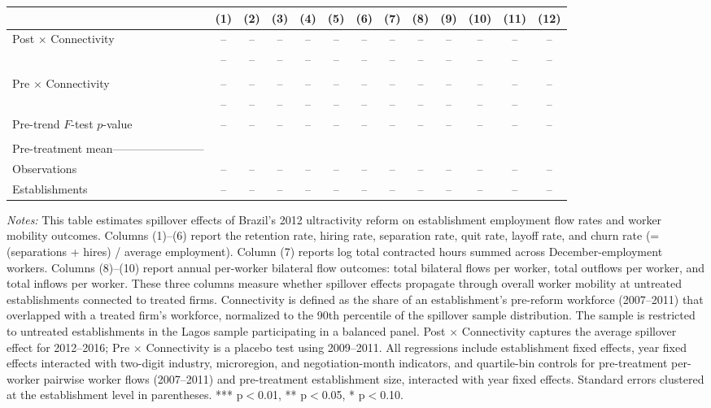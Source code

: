 \documentclass[12pt,letterpaper]{article}
\begin{document}
\begin{table}[]
\begin{threeparttable}
\begin{tabular}{lcccccccccccc}
 & (1) & (2) & (3) & (4) & (5) & (6) & (7) & (8) & (9) & (10) & (11) & (12) \\
\midrule
Post $\times$ Connectivity & -- & -- & -- & -- & -- & -- & -- & -- & -- & -- & -- & -- \\
  & -- & -- & -- & -- & -- & -- & -- & -- & -- & -- & -- & -- \\
  &  &  &  &  &  &  &  &  &  &  &  & \\
Pre $\times$ Connectivity & -- & -- & -- & -- & -- & -- & -- & -- & -- & -- & -- & -- \\
  & -- & -- & -- & -- & -- & -- & -- & -- & -- & -- & -- & -- \\
Pre-trend $F$-test $p$-value & -- & -- & -- & -- & -- & -- & -- & -- & -- & -- & -- & -- \\
  &  &  &  &  &  &  &  &  &  &  &  & \\
Pre-treatment mean------------------------ \\
Observations & -- & -- & -- & -- & -- & -- & -- & -- & -- & -- & -- & -- \\
Establishments & -- & -- & -- & -- & -- & -- & -- & -- & -- & -- & -- & -- \\
\bottomrule
\end{tabular}
\scriptsize
\begin{tablenotes}
\item \textit{Notes:} This table estimates spillover effects of Brazil's 2012 ultractivity reform on establishment employment flow rates and worker mobility outcomes. Columns (1)--(6) report the retention rate, hiring rate, separation rate, quit rate, layoff rate, and churn rate (= (separations + hires) / average employment). Column (7) reports log total contracted hours summed across December-employment workers. Columns (8)--(10) report annual per-worker bilateral flow outcomes: total bilateral flows per worker, total outflows per worker, and total inflows per worker. These three columns measure whether spillover effects propagate through overall worker mobility at untreated establishments connected to treated firms. Connectivity is defined as the share of an establishment's pre-reform workforce (2007--2011) that overlapped with a treated firm's workforce, normalized to the 90th percentile of the spillover sample distribution. The sample is restricted to untreated establishments in the Lagos sample participating in a balanced panel. Post $\times$ Connectivity captures the average spillover effect for 2012--2016; Pre $\times$ Connectivity is a placebo test using 2009--2011. All regressions include establishment fixed effects, year fixed effects interacted with two-digit industry, microregion, and negotiation-month indicators, and quartile-bin controls for pre-treatment per-worker pairwise worker flows (2007--2011) and pre-treatment establishment size, interacted with year fixed effects. Standard errors clustered at the establishment level in parentheses. *** p$<$0.01, ** p$<$0.05, * p$<$0.10.
\end{tablenotes}
\end{threeparttable}
\end{table}

\clearpage
\end{document}
